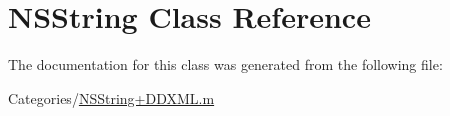 \hypertarget{class_n_s_string}{
\section{NSString Class Reference}
\label{class_n_s_string}
}


The documentation for this class was generated from the following file:\begin{DoxyCompactItemize}
\item 
Categories/\hyperlink{_n_s_string_09_d_d_x_m_l_8m}{NSString+DDXML.m}\end{DoxyCompactItemize}
